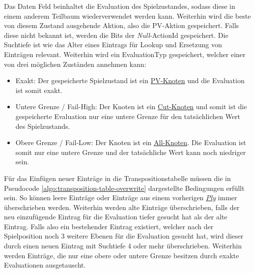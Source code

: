 Das Daten Feld beinhaltet die Evaluation des Spielzustandes, sodass diese in einem anderem Teilbaum wiederverwendet werden kann. Weiterhin wird die beste von diesem Zustand ausgehende Aktion, also die \ac{PV}-Aktion gespeichert. Falls diese nicht bekannt ist, werden die Bits der \emph{Null}-ActionId gespeichert. Die Suchtiefe ist wie das Alter eines Eintrags für Lookup und Ersetzung von Einträgen relevant. Weiterhin wird ein EvaluationTyp gespeichert, welcher einer von drei möglichen Zuständen annehmen kann:

\begin{itemize}
    \item Exakt: Der gespeicherte Spielzustand ist ein \hyperref[text:pv-node]{\acs{PV}-Knoten} und die Evaluation ist somit exakt.
    \item Untere Grenze / Fail-High: Der Knoten ist ein \hyperref[text:cut-node]{Cut-Knoten} und somit ist die gespeicherte Evaluation nur eine untere Grenze für den tatsächlichen Wert des Spielzustands.
    \item Obere Grenze / Fail-Low: Der Knoten ist ein \hyperref[text:all-node]{All-Knoten}. Die Evaluation ist somit nur eine untere Grenze und der tatsächliche Wert kann noch niedriger sein.
\end{itemize}

Für das Einfügen neuer Einträge in die Transpositionstabelle müssen die in Pseudocode \ref{algo:transposition-table-overwrite} dargestellte Bedingungen erfüllt sein. So können leere Einträge oder Einträge aus einem vorherigen \hyperref[text:ply]{\emph{Ply}} immer überschrieben werden. Weiterhin werden alte Einträge überschrieben, falls der neu einzufügende Eintrag für die Evaluation tiefer gesucht hat als der alte Eintrag. Falls also ein bestehender Eintrag existiert, welcher nach der Spielposition noch 3 weitere Ebenen für die Evaluation gesucht hat, wird dieser durch einen neuen Eintrag mit Suchtiefe 4 oder mehr überschrieben. Weiterhin werden Einträge, die nur eine obere oder untere Grenze besitzen durch exakte Evaluationen ausgetauscht.

\pagebreak


